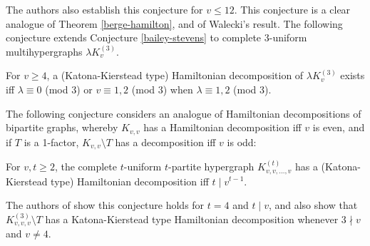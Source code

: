 The authors also establish this conjecture for $v \leq 12$. This conjecture is a
clear analogue of Theorem \ref{berge-hamilton}, and of Walecki's result. The
following conjecture extends Conjecture
\ref{bailey-stevens} to complete $3$-uniform multihypergraphs $\lambda K_v^{(3)}$.

\begin{conjecture}
For $v \geq 4$, a (Katona-Kierstead type) Hamiltonian decomposition of
$\lambda K_v^{(3)}$ exists iff $\lambda \equiv 0$ (mod $3$) or $v \equiv 1, 2$
(mod $3$) when $\lambda \equiv 1,2$ (mod $3$).
\end{conjecture}

The following conjecture considers an analogue of
Hamiltonian decompositions of bipartite graphs, whereby $K_{v,v}$ has a
Hamiltonian decomposition iff $v$ is even, and if $T$ is a 1-factor,
$K_{v,v} \setminus T$ has a decomposition iff $v$ is odd:

\begin{conjecture}
For $v, t \geq 2$, the complete $t$-uniform $t$-partite hypergraph
$K_{v,v,\ldots,v}^{(t)}$ has a (Katona-Kierstead type) Hamiltonian decomposition iff
$t \mid v^{t-1}$.
\end{conjecture}

The authors of \cite{kuhl-schr} show this conjecture holds for $t = 4$ and $t \mid v$, and
also show that $K_{v,v,v}^{(3)} \setminus T$ has a Katona-Kierstead type Hamiltonian decomposition
whenever $3 \nmid v$ and $v \neq 4$.
